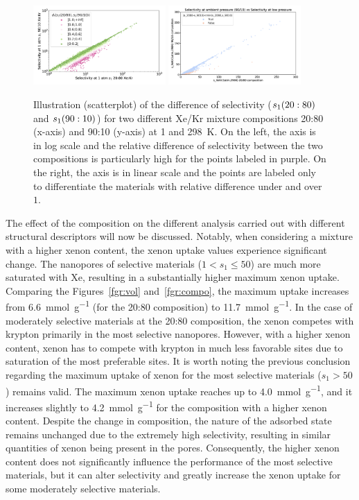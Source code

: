 \documentclass[main.tex]{subfiles}
\begin{document}
\begin{figure}[ht]
  \centering
    \includegraphics[width=0.45\textwidth]{figures/2-thermo/s_2080_vs_s_9010_overview_log.jpg}
    \includegraphics[width=0.45\textwidth]{figures/2-thermo/s_2080_vs_s_9010_overview.jpg}
    \caption{Illustration (scatterplot) of the difference of selectivity ($s_{\text{1}}(20:80)$ and $s_{\text{1}}(90:10)$) for two different Xe/Kr mixture compositions 20:80 (x-axis) and 90:10 (y-axis) at \SI{1}{\atm} and \SI{298}{\kelvin}. On the left, the axis is in log scale and the relative difference of selectivity between the two compositions is particularly high for the points labeled in purple. On the right, the axis is in linear scale and the points are labeled only to differentiate the materials with relative difference under and over $1$.}\label{fgr:SI:overview_2080_9010}
  \end{figure}

The effect of the composition on the different analysis carried out with different structural descriptors will now be discussed. Notably, when considering a mixture with a higher xenon content, the xenon uptake values experience significant change. The nanopores of selective materials ($1<s_1\leq 50$) are much more saturated with Xe, resulting in a substantially higher maximum xenon uptake. Comparing the Figures~\ref{fgr:vol} and~\ref{fgr:compo}, the maximum uptake increases from \SI{6.6}{\milli\mole\per\gram} (for the 20:80 composition) to \SI{11.7}{\milli\mole\per\gram}. In the case of moderately selective materials at the 20:80 composition, the xenon competes with krypton primarily in the most selective nanopores. However, with a higher xenon content, xenon has to compete with krypton in much less favorable sites due to saturation of the most preferable sites. It is worth noting the previous conclusion regarding the maximum uptake of xenon for the most selective materials ($s_1>50$) remains valid. The maximum xenon uptake reaches up to \SI{4.0}{\milli\mole\per\gram}, and it increases slightly to \SI{4.2}{\milli\mole\per\gram} for the composition with a higher xenon content. Despite the change in composition, the nature of the adsorbed state remains unchanged due to the extremely high selectivity, resulting in similar quantities of xenon being present in the pores. Consequently, the higher xenon content does not significantly influence the performance of the most selective materials, but it can alter selectivity and greatly increase the xenon uptake for some moderately selective materials.
\end{document}
